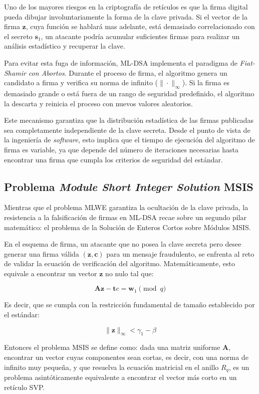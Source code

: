 \documentclass[11pt, a4paper]{report}
\theoremstyle{definition}
\begin{document}
Uno de los mayores riesgos en la criptografía de retículos es que la firma digital pueda dibujar involuntariamente la forma de la clave privada. Si el vector de la firma $\mathbf{z}$, cuya función se hablará mas adelante, está demasiado correlacionado con el secreto $\mathbf{s}_1$, un atacante podría acumular suficientes firmas para realizar un análisis estadístico y recuperar la clave.

Para evitar esta fuga de información, ML-DSA implementa el paradigma de \textit{Fiat-Shamir con Abortos}\cite{lyubashevsky2009fiat}. Durante el proceso de firma, el algoritmo genera un candidato a firma y verifica su norma de infinito ($\|\cdot\|_\infty$). Si la firma es demasiado grande o está fuera de un rango de seguridad predefinido, el algoritmo la descarta y reinicia el proceso con nuevos valores aleatorios.

Este mecanismo garantiza que la distribución estadística de las firmas publicadas sea completamente independiente de la clave secreta. Desde el punto de vista de la ingeniería de \textit{software}, esto implica que el tiempo de ejecución del algoritmo de firma es variable, ya que depende del número de iteraciones necesarias hasta encontrar una firma que cumpla los criterios de seguridad del estándar.

\subsection{Problema \textit{Module Short Integer Solution} MSIS}

Mientras que el problema MLWE garantiza la ocultación de la clave privada, la resistencia a la falsificación de firmas en ML-DSA recae sobre un segundo pilar matemático: el problema de la Solución de Enteros Cortos sobre Módulos MSIS.

En el esquema de firma, un atacante que no posea la clave secreta pero desee generar una firma válida $(\mathbf{z}, \mathbf{c})$ para un mensaje fraudulento, se enfrenta al reto de validar la ecuación de verificación del algoritmo. Matemáticamente, esto equivale a encontrar un vector $\mathbf{z}$ no nulo tal que:

$$ \mathbf{A}\mathbf{z} - \mathbf{t}c = \mathbf{w}_1 \pmod q $$

Es decir, que se cumpla con la restricción fundamental de tamaño establecido por el estándar:

$$ \|\mathbf{z}\|_\infty < \gamma_1 - \beta $$

Entonces el problema MSIS se define como: dada una matriz uniforme $\mathbf{A}$, encontrar un vector cuyas componentes sean cortas, es decir, con una norma de infinito muy pequeña, y que resuelva la ecuación matricial en el anillo $R_q$, es un problema asintóticamente equivalente a encontrar el vector más corto en un retículo SVP. 
\end{document}
